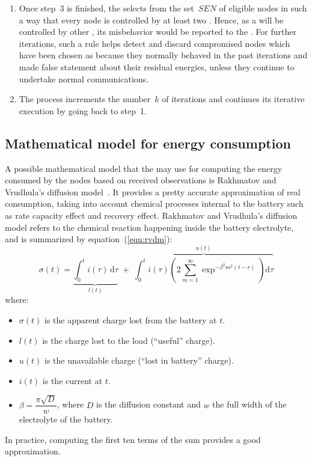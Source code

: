 \begin{enumerate}
\begin{itemize}
        \end{itemize}
    \item Once step~3 is finished, the \CH selects \cns from the set~$SEN$ of eligible nodes in such a way that every node is controlled by at least two \cns.
        Hence, as a \cn will be controlled by other \cns, its misbehavior would be reported to the \CH.
        For further iterations, such a rule helps detect and discard compromised nodes which have been chosen as \cn because they normally behaved in the past iterations and made false statement about their residual energies, unless they continue to undertake normal communications.
    \item The process increments the number~$k$ of iterations and continues its iterative execution by going back to step~1.
\end{enumerate}

\subsection{Mathematical model for energy consumption}

A possible mathematical model that the \chs may use for computing the energy consumed by the nodes based on received observations is Rakhmatov and Vrudhula's diffusion model~\cite{RV01}.
It provides a pretty accurate approximation of real consumption, taking into account chemical processes internal to the battery such as rate capacity effect and recovery effect.
Rakhmatov and Vrudhula's diffusion model refers to the chemical reaction happening inside the battery electrolyte, and is summarized by equation~(\ref{eqn:rvdm}):
\begin{equation}
    \label{eqn:rvdm}
    \sigma(t) = \underbrace{\int_{0}^{t} i(\tau) \, \mathrm d\tau}_{l(t)} \;+\; \overbrace{\int_{0}^{t} i(\tau) \left(2 \sum_{m=1}^{\infty} \exp^{-\beta^2 m^2 (t-r)} \right) \mathrm d\tau}^{u(t)}
\end{equation}
where:
\begin{itemize}
    \item $\sigma(t)$ is the apparent charge lost from the battery at $t$.
    \item $l(t)$ is the charge lost to the load (``useful'' charge).
    \item $u(t)$ is the unavailable charge (``lost in battery'' charge).
    \item $i(t)$ is the current at $t$.
    \item $\beta = \dfrac{\pi\sqrt{D}}{w}$, where $D$ is the diffusion constant and $w$ the full width of the electrolyte of the battery.
\end{itemize}
In practice, computing the first ten terms of the sum provides a good approximation.

